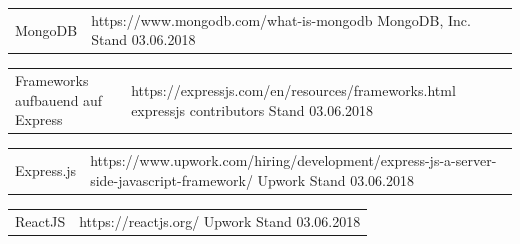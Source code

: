 \documentclass[12pt,a4paper]{report}
\begin{document}

%

\begin{thebibliography}{}
	
	\begin{tabular}[t]{p{6cm} p{10cm}}
		MongoDB & https://www.mongodb.com/what-is-mongodb
		\newline MongoDB, Inc.
		\newline Stand 03.06.2018\\	
	\end{tabular}
	
	\begin{tabular}[t]{p{6cm} p{10cm}}
		Frameworks aufbauend auf Express & https://expressjs.com/en/resources/frameworks.html
		\newline expressjs contributors
		\newline Stand 03.06.2018\\	
	\end{tabular}
	
	\begin{tabular}[t]{p{6cm} p{10cm}}
		Express.js & https://www.upwork.com/hiring/development/express-js-a-server-side-javascript-framework/
		\newline Upwork
		\newline Stand 03.06.2018\\	
	\end{tabular}

	\begin{tabular}[t]{p{6cm} p{10cm}}
		ReactJS & https://reactjs.org/
		\newline Upwork
		\newline Stand 03.06.2018\\	
	\end{tabular}

\end{thebibliography}


\end{document}

